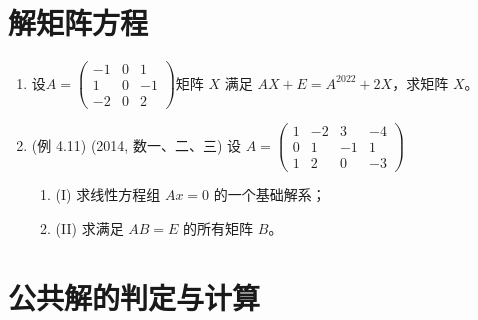 \documentclass[12pt, a4paper, oneside, UTF8]{ctexbook}
\begin{document}
\section{解矩阵方程}

\begin{enumerate}
    \item 设$A=\begin{pmatrix}
        -1 & 0 & 1\\
        1 & 0 & -1 \\
        -2 & 0 & 2
    \end{pmatrix}$矩阵 $X$ 满足 $AX + E = A^{2022} + 2X$，求矩阵 $X$。
    
    \begin{solution}
    \newpage
    \end{solution}
    
    \item (例 4.11) (2014, 数一、二、三) 设 
    $
    A = \begin{pmatrix}
    1 & -2 & 3 & -4 \\
    0 & 1 & -1 & 1 \\
    1 & 2 & 0 & -3
    \end{pmatrix}
    $
    \begin{enumerate}
        \item (I) 求线性方程组 $Ax = 0$ 的一个基础解系；
        \item (II) 求满足 $AB = E$ 的所有矩阵 $B$。
    \end{enumerate}
    
    \begin{solution}
    \newpage
    \end{solution}
\end{enumerate}

\section{公共解的判定与计算}
\end{document}
